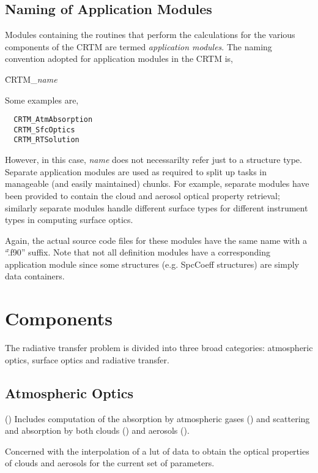 \subsection{Naming of Application Modules}
Modules containing the routines that perform the calculations for the various components of the CRTM are termed \textit{application modules}. The naming convention adopted for application modules in the CRTM is, 

\hspace{0.5cm}\f{CRTM\_}\textit{name}

Some examples are,
\begin{ttfamily}
  \begin{verbatim}
  CRTM_AtmAbsorption
  CRTM_SfcOptics
  CRTM_RTSolution\end{verbatim}
\end{ttfamily}
However, in this case, \textit{name} does not necessarilty refer just to a structure type. Separate application modules are used as required to split up tasks in manageable (and easily maintained) chunks. For example, separate modules have been provided to contain the cloud and aerosol optical property retrieval; similarly separate modules handle different surface types for different instrument types in computing surface optics.

Again, the actual source code files for these modules have the same name with a ``\f{.f90}'' suffix. Note that not all definition modules have a corresponding application module since some structures (e.g. SpcCoeff structures) are simply data containers.





\section{Components}
The radiative transfer problem is divided into three broad categories: atmospheric optics, surface optics and radiative transfer.

\subsection{Atmospheric Optics}
(\AtmOptics) Includes computation of the absorption by atmospheric gases (\AtmAbsorption) and scattering and absorption by both clouds (\CloudScatter) and aerosols (\AerosolScatter).

  Concerned with the interpolation of a lut of data to obtain the optical properties of clouds and aerosols for the current set of parameters.


